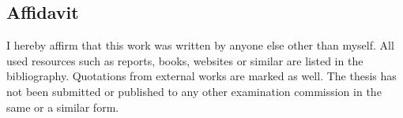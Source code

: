 \subsection*{Affidavit}
I hereby affirm that this work was written by anyone else other than myself. All used resources such as reports, books, websites or similar are listed in the bibliography. Quotations from external works are marked as well. The thesis has not been submitted or published to any other examination commission in the same or a similar form.\\

\thesisDate \\

\studentName
